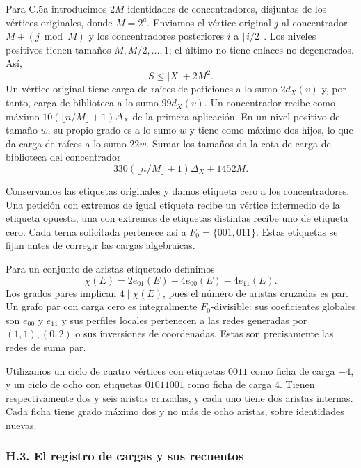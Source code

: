 \documentclass[spanish,11pt,a4paper]{article}
\begin{document}
Para C.5a introducimos \(2M\) identidades de concentradores, disjuntas de los vértices originales, donde \(M=2^a\). Enviamos el vértice original \(j\) al concentrador \(M+(j\bmod M)\) y los concentradores posteriores \(i\) a \(\lfloor i/2\rfloor\). Los niveles positivos tienen tamaños \(M,M/2,\ldots,1\); el último no tiene enlaces no degenerados. Así, \[S\le|X|+2M^2.\] Un vértice original tiene carga de raíces de peticiones a lo sumo \(2d_X(v)\) y, por tanto, carga de biblioteca a lo sumo \(99d_X(v)\). Un concentrador recibe como máximo \(10(\lfloor n/M\rfloor+1)\Delta_X\) de la primera aplicación. En un nivel positivo de tamaño \(w\), su propio grado es a lo sumo \(w\) y tiene como máximo dos hijos, lo que da carga de raíces a lo sumo \(22w\). Sumar los tamaños da la cota de carga de biblioteca del concentrador \[330(\lfloor n/M\rfloor+1)\Delta_X+1452M.\]

Conservamos las etiquetas originales y damos etiqueta cero a los concentradores. Una petición con extremos de igual etiqueta recibe un vértice intermedio de la etiqueta opuesta; una con extremos de etiquetas distintas recibe uno de etiqueta cero. Cada terna solicitada pertenece así a \(F_0=\{001,011\}\). Estas etiquetas se fijan antes de corregir las cargas algebraicas.

Para un conjunto de aristas etiquetado definimos \[\chi(E)=2e_{01}(E)-4e_{00}(E)-4e_{11}(E).\] Los grados pares implican \(4\mid\chi(E)\), pues el número de aristas cruzadas es par. Un grafo par con carga cero es integralmente \(F_0\)-divisible: sus coeficientes globales son \(e_{00}\) y \(e_{11}\) y sus perfiles locales pertenecen a las redes generadas por \((1,1),(0,2)\) o sus inversiones de coordenadas. Estas son precisamente las redes de suma par.

Utilizamos un ciclo de cuatro vértices con etiquetas \(0011\) como ficha de carga \(-4\), y un ciclo de ocho con etiquetas \(01011001\) como ficha de carga \(4\). Tienen respectivamente dos y seis aristas cruzadas, y cada uno tiene dos aristas internas. Cada ficha tiene grado máximo dos y no más de ocho aristas, sobre identidades nuevas.

\subsubsection{H.3. El registro de cargas y sus recuentos}\label{h.3.-el-registro-de-cargas-y-sus-recuentos}
\end{document}
